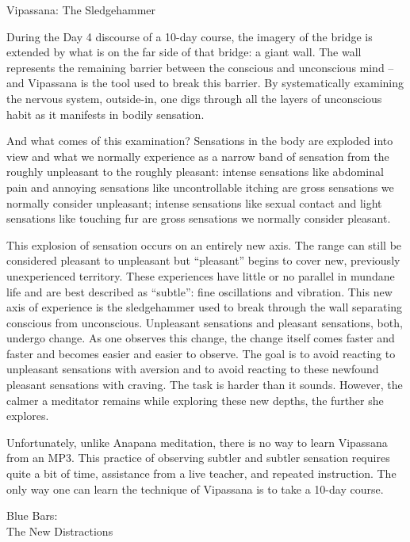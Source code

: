 \documentclass{article}
\begin{document}
\begin{center}
  \LARGE{Vipassana: The Sledgehammer}
\end{center}

During the Day 4 discourse of a 10-day course, the imagery of the bridge is extended by what is on the far side of that bridge: a giant wall. The wall represents the remaining barrier between the conscious and unconscious mind -- and Vipassana is the tool used to break this barrier. By systematically examining the nervous system, outside-in, one digs through all the layers of unconscious habit as it manifests in bodily sensation.

And what comes of this examination? Sensations in the body are exploded into view and what we normally experience as a narrow band of sensation from the roughly unpleasant to the roughly pleasant: intense sensations like abdominal pain and annoying sensations like uncontrollable itching are gross sensations we normally consider unpleasant; intense sensations like sexual contact and light sensations like touching fur are gross sensations we normally consider pleasant.

This explosion of sensation occurs on an entirely new axis. The range can still be considered pleasant to unpleasant but ``pleasant'' begins to cover new, previously unexperienced territory. These experiences have little or no parallel in mundane life and are best described as ``subtle'': fine oscillations and vibration. This new axis of experience is the sledgehammer used to break through the wall separating conscious from unconscious. Unpleasant sensations and pleasant sensations, both, undergo change. As one observes this change, the change itself comes faster and faster and becomes easier and easier to observe. The goal is to avoid reacting to unpleasant sensations with aversion and to avoid reacting to these newfound pleasant sensations with craving. The task is harder than it sounds. However, the calmer a meditator remains while exploring these new depths, the further she explores.

Unfortunately, unlike Anapana meditation, there is no way to learn Vipassana from an MP3. This practice of observing subtler and subtler sensation requires quite a bit of time, assistance from a live teacher, and repeated instruction. The only way one can learn the technique of Vipassana is to take a 10-day course.


\pagebreak

\begin{center}
  \Huge{Blue Bars:}\\
  \Huge{The New Distractions}
\end{center}
\end{document}
